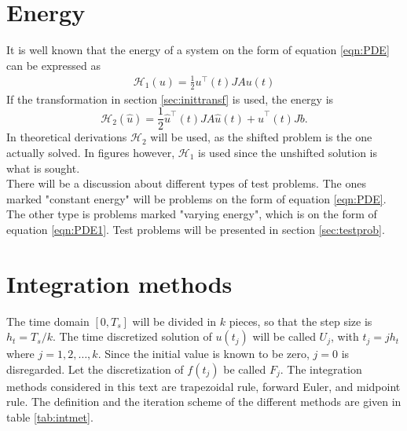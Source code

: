 \section{Energy}%
It is well known that the energy of a system on the form of equation \eqref{eqn:PDE} can be expressed as \cite{energy}
\begin{equation*}
\begin{aligned}
\mathcal{H}_1(u) = \frac{1}{2} u^\top (t) J A u(t)
\end{aligned}
\end{equation*}
\noindent If the transformation in section \ref{sec:inittransf} is used, the energy is 
\begin{equation}
\mathcal{H}_2 (\hat{u}) = \frac{1}{2} \hat{u}^\top (t)  J A \hat{u}(t) + \hat{u}^\top (t)  J b.
\label{eqn:energy2}
\end{equation}
\noindent In theoretical derivations $\mathcal{H}_2$ will be used, as the shifted problem is the one actually solved. In figures however, $\mathcal{H}_1$ is used since the unshifted solution is what is sought. \\

\noindent There will be a discussion about different types of test problems. The ones marked "constant energy" will be problems on the form of equation \eqref{eqn:PDE}. The other type is problems marked "varying energy", which is on the form of equation \eqref{eqn:PDE1}. Test problems will be presented in section \ref{sec:testprob}.

\section{Integration methods}%
\noindent The time domain $[0,T_s]$ will be divided in $k$ pieces, so that the step size is $h_t = T_s/k$. The time discretized solution of $u(t_j)$ will be called $U_j$, with $t_j = j h_t$ where $ j = 1,2,\dots,k $. Since the initial value is known to be zero, $j = 0$ is disregarded. Let the discretization of $f(t_j)$ be called $F_j$. The integration methods considered in this text are trapezoidal rule, forward Euler, and midpoint rule. The definition and the iteration scheme of the different methods are given in table \ref{tab:intmet}. \\

